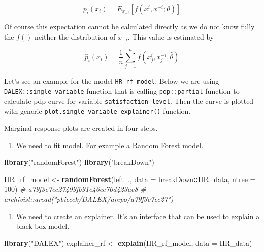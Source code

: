 \documentclass[]{book}
\newenvironment{Shaded}{\begin{snugshade}}{\end{snugshade}}
\newcommand{\KeywordTok}[1]{\textcolor[rgb]{0.13,0.29,0.53}{\textbf{#1}}}
\newcommand{\DataTypeTok}[1]{\textcolor[rgb]{0.13,0.29,0.53}{#1}}
\newcommand{\DecValTok}[1]{\textcolor[rgb]{0.00,0.00,0.81}{#1}}
\newcommand{\StringTok}[1]{\textcolor[rgb]{0.31,0.60,0.02}{#1}}
\newcommand{\CommentTok}[1]{\textcolor[rgb]{0.56,0.35,0.01}{\textit{#1}}}
\newcommand{\OperatorTok}[1]{\textcolor[rgb]{0.81,0.36,0.00}{\textbf{#1}}}
\newcommand{\NormalTok}[1]{#1}
\providecommand{\tightlist}{%
  \setlength{\itemsep}{0pt}\setlength{\parskip}{0pt}}
\theoremstyle{definition}
\theoremstyle{definition}
\theoremstyle{definition}
\theoremstyle{remark}
\begin{document}
\[
p_i(x_i) = E_{x_{-i}}[ f(x^i, x^{-i}; \theta) ]
\]

Of course this expectation cannot be calculated directly as we do not
know fully the \(f()\) neither the distribution of \(x_{-i}\). This
value is estimated by

\[
\hat p_i(x_i) = \frac{1}{n} \sum_{j=1}^{n} f(x^i_j, x_j^{-i}, \hat \theta) 
\]

Let's see an example for the model \texttt{HR\_rf\_model}. Below we are
using \texttt{DALEX::single\_variable} function that is calling
\texttt{pdp::partial} function to calculate pdp curve for variable
\texttt{satisfaction\_level}. Then the curve is plotted with generic
\texttt{plot.single\_variable\_explainer()} function.

Marginal response plots are created in four steps.

\begin{enumerate}
\def\labelenumi{\arabic{enumi}.}
\tightlist
\item
  We need to fit model. For example a Random Forest model.
\end{enumerate}

\begin{Shaded}
\begin{Highlighting}[]
\KeywordTok{library}\NormalTok{(}\StringTok{"randomForest"}\NormalTok{)}
\KeywordTok{library}\NormalTok{(}\StringTok{"breakDown"}\NormalTok{)}

\NormalTok{HR_rf_model <-}\StringTok{ }\KeywordTok{randomForest}\NormalTok{(left}\OperatorTok{~}\NormalTok{., }\DataTypeTok{data =}\NormalTok{ breakDown}\OperatorTok{::}\NormalTok{HR_data, }\DataTypeTok{ntree =} \DecValTok{100}\NormalTok{)}
\CommentTok{# a79f3c7ec27499fb91e46ee70d423ac8}
\CommentTok{# archivist::aread("pbiecek/DALEX/arepo/a79f3c7ec27")}
\end{Highlighting}
\end{Shaded}

\begin{enumerate}
\def\labelenumi{\arabic{enumi}.}
\setcounter{enumi}{1}
\tightlist
\item
  We need to create an explainer. It's an interface that can be used to
  explain a black-box model.
\end{enumerate}

\begin{Shaded}
\begin{Highlighting}[]
\KeywordTok{library}\NormalTok{(}\StringTok{"DALEX"}\NormalTok{)}
\NormalTok{explainer_rf  <-}\StringTok{ }\KeywordTok{explain}\NormalTok{(HR_rf_model, }\DataTypeTok{data =}\NormalTok{ HR_data)}
\end{Highlighting}
\end{Shaded}
\end{document}
